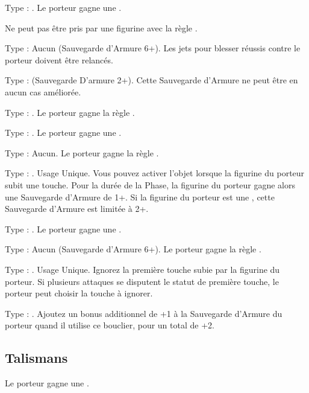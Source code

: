 Type : \ha{}. Le porteur gagne une .

Ne peut pas être pris par une figurine avec la règle \largetarget{}.

Type : Aucun (Sauvegarde d'Armure 6+). Les jets pour blesser réussis contre le porteur doivent être relancés.

Type : \ha{} (Sauvegarde D'armure 2+). Cette Sauvegarde d'Armure ne peut être en aucun cas améliorée.

Type : \ha{}. Le porteur gagne la règle \distracting{}.

Type : \ha{}. Le porteur gagne une .

Type : Aucun. Le porteur gagne la règle .

\columnbreak

Type : \ha{}. Usage Unique. Vous pouvez activer l'objet lorsque la figurine du porteur subit une touche. Pour la durée de la Phase, la figurine du porteur gagne alors une Sauvegarde d'Armure de 1+. Si la figurine du porteur est une \largetarget{}, cette Sauvegarde d'Armure est limitée à 2+.

Type : \ha{}. Le porteur gagne une .

Type : Aucun (Sauvegarde d'Armure 6+). Le porteur gagne la règle \fireborn{}.

Type : \shield{}. Usage Unique. Ignorez la première touche subie par la figurine du porteur. Si plusieurs attaques se disputent le statut de première touche, le porteur peut choisir la touche à ignorer.

Type : \shield{}. Ajoutez un bonus additionnel de +1 à la Sauvegarde d'Armure du porteur quand il utilise ce bouclier, pour un total de +2.

\endpricelist

\newpage
\hypertarget{talismans}{\subsection{Talismans}}
\label{talismans}

\startpricelist

Le porteur gagne une .

